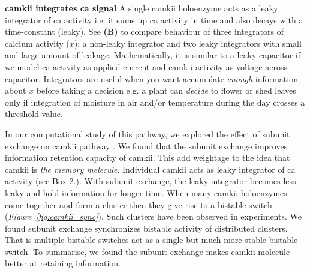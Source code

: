 \documentclass[]{resonance}
\newcommand\Fig[1]{\textit{Figure~\ref{#1}}}
\begin{document}
{    \textbf{\gls{camkii} integrates \gls{ca} signal} A single \gls{camkii}
    holoenzyme acts as a leaky integrator of \gls{ca} activity i.e. it sums up
    \gls{ca} activity in time and also decays with a time-constant (leaky). See
    \textbf{(B)} to compare behaviour of three integrators of calcium activity
    ($x$): a non-leaky integrator and two leaky integrators with small and large
    amount of leakage.  Mathematically, it is similar to a leaky capacitor if we
    model \gls{ca} activity as applied current and \gls{camkii} activity as
    voltage across capacitor.  Integrators are useful when you want accumulate
    \emph{enough} information about $x$ before taking a decision e.g. a plant
    can \emph{decide} to flower or shed leaves only if integration of moisture
    in air and/or temperature during the day crosses a threshold value.

} %

In our computational study of this pathway, we explored the effect of subunit
exchange on \gls{camkii} pathway \cite{SinghAndBhalla2018}.  We found that the
subunit exchange improves information retention capacity of \gls{camkii}. This
add weightage to the idea that \gls{camkii} is \textit{the memory melecule}.
Individual \gls{camkii} acts as leaky integrator of \gls{ca} activity (see Box
2.). With subunit exchange, the leaky integrator becomes less leaky and hold
information for longer time. When many \gls{camkii} holoenzymes come together
and form a cluster then they give rise to a bistable switch
(\Fig{fig:camkii_sync}). Such clusters have been observed in experiments. We
found subunit exchange synchronizes bistable activity of distributed clusters.
That is multiple bistable switches act as a single but much more stable bistable
switch. To summarise, we found the subunit-exchange makes \gls{camkii} molecule
better at retaining information.
\end{document}
